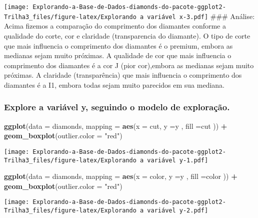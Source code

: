 \documentclass[
]{article}
\newenvironment{Shaded}{\begin{snugshade}}{\end{snugshade}}
\newcommand{\DataTypeTok}[1]{\textcolor[rgb]{0.13,0.29,0.53}{#1}}
\newcommand{\KeywordTok}[1]{\textcolor[rgb]{0.13,0.29,0.53}{\textbf{#1}}}
\newcommand{\NormalTok}[1]{#1}
\newcommand{\OperatorTok}[1]{\textcolor[rgb]{0.81,0.36,0.00}{\textbf{#1}}}
\newcommand{\StringTok}[1]{\textcolor[rgb]{0.31,0.60,0.02}{#1}}
\begin{document}
\texttt{[image: Explorando-a-Base-de-Dados-diamonds-do-pacote-ggplot2-Trilha3\_files/figure-latex/Explorando a variável x-3.pdf]}
\#\#\# Análise: Acima fizemos a comparação do comprimento dos diamantes
conforme a qualidade do corte, cor e claridade (transparencia do
diamante). O tipo de corte que mais influencia o comprimento dos
diamantes é o premium, embora as medianas sejam muito próximas. A
qualidade de cor que mais influencia o comprimento dos diamantes é a cor
J (pior cor),embora as medianas sejam muito próximas. A claridade
(transparência) que mais influencia o comprimento dos diamantes é a I1,
embora todas sejam muito parecidos em sua mediana.

\hypertarget{explore-a-variuxe1vel-y-seguindo-o-modelo-de-explorauxe7uxe3o.}{%
\subsubsection{Explore a variável y, seguindo o modelo de
exploração.}\label{explore-a-variuxe1vel-y-seguindo-o-modelo-de-explorauxe7uxe3o.}}

\begin{Shaded}
\begin{Highlighting}[]
\KeywordTok{ggplot}\NormalTok{(}\DataTypeTok{data =}\NormalTok{ diamonds, }\DataTypeTok{mapping =} \KeywordTok{aes}\NormalTok{(}\DataTypeTok{x =}\NormalTok{ cut, }\DataTypeTok{y =}\NormalTok{y , }\DataTypeTok{fill =}\NormalTok{cut )) }\OperatorTok{+}\StringTok{ }\KeywordTok{geom_boxplot}\NormalTok{(}\DataTypeTok{outlier.color =} \StringTok{"red"}\NormalTok{)}
\end{Highlighting}
\end{Shaded}

\texttt{[image: Explorando-a-Base-de-Dados-diamonds-do-pacote-ggplot2-Trilha3\_files/figure-latex/Explorando a variável y-1.pdf]}

\begin{Shaded}
\begin{Highlighting}[]
\KeywordTok{ggplot}\NormalTok{(}\DataTypeTok{data =}\NormalTok{ diamonds, }\DataTypeTok{mapping =} \KeywordTok{aes}\NormalTok{(}\DataTypeTok{x =}\NormalTok{ color, }\DataTypeTok{y =}\NormalTok{y , }\DataTypeTok{fill =}\NormalTok{color )) }\OperatorTok{+}\StringTok{ }\KeywordTok{geom_boxplot}\NormalTok{(}\DataTypeTok{outlier.color =} \StringTok{"red"}\NormalTok{)}
\end{Highlighting}
\end{Shaded}

\texttt{[image: Explorando-a-Base-de-Dados-diamonds-do-pacote-ggplot2-Trilha3\_files/figure-latex/Explorando a variável y-2.pdf]}
\end{document}
